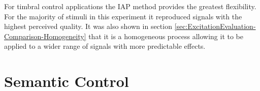 	For timbral control applications the IAP method provides the greatest flexibility. For the majority of stimuli in
	this experiment it reproduced signals with the highest perceived quality. It was also shown in section
	\ref{sec:ExcitationEvaluation-Comparison-Homogeneity} that it is a homogeneous process allowing it to be applied to
	a wider range of signals with more predictable effects.

\section{Semantic Control}
\label{sec:PerceptualExperiments-SemanticControl}
